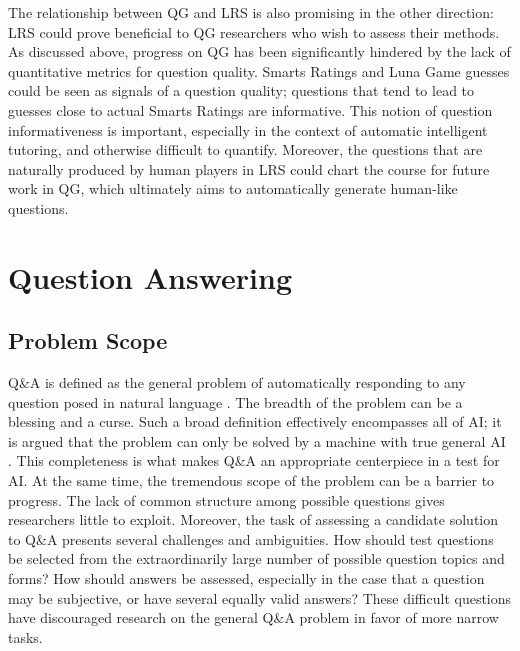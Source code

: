 The relationship between QG and LRS is also promising in the other direction: LRS could prove beneficial to QG researchers who wish to assess their methods. As discussed above, progress on QG has been significantly hindered by the lack of quantitative metrics for question quality. Smarts Ratings and Luna Game guesses could be seen as signals of a question quality; questions that tend to lead to guesses close to actual Smarts Ratings are informative.  This notion of question informativeness is important, especially in the context of automatic intelligent tutoring, and otherwise difficult to quantify. Moreover, the questions that are naturally produced by human players in LRS could chart the course for future work in QG, which ultimately aims to automatically generate human-like questions.

\section{Question Answering}

\subsection{Problem Scope}

Q\&A is defined as the general problem of automatically responding to any question posed in natural language \citep{andrenucci2005automated, hirschman2001natural}. The breadth of the problem can be a blessing and a curse. Such a broad definition effectively encompasses all of AI; it is argued that the problem can only be solved by a machine with true general AI \citep{yampolskiy2013turing}. This completeness is what makes Q\&A an appropriate centerpiece in a test for AI. At the same time, the tremendous scope of the problem can be a barrier to progress. The lack of common structure among possible questions gives researchers little to exploit. Moreover, the task of assessing a candidate solution to Q\&A presents several challenges and ambiguities. How should test questions be selected from the extraordinarily large number of possible question topics and forms? How should answers be assessed, especially in the case that a question may be subjective, or have several equally valid answers? These difficult questions have discouraged research on the general Q\&A problem in favor of more narrow tasks.

